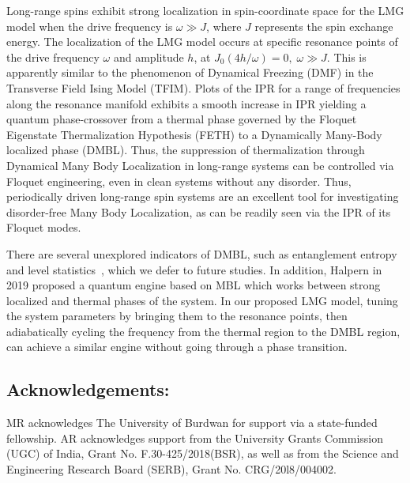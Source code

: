 \documentclass[%
reprint,
superscriptaddress,
amsmath,amssymb,
aps,
prb,
showkeys,
]{revtex4-2}
\begin{document}
Long-range spins exhibit strong localization in spin-coordinate space for the LMG model when the drive frequency is $\omega \gg J$, where $J$ represents the spin exchange energy. The localization of the LMG model occurs at specific resonance points of the drive frequency $\omega$ and amplitude $h$, at $J_0(4h/\omega)=0,\; \omega \gg J$. This is apparently similar to the phenomenon of Dynamical Freezing (DMF) in the Transverse Field Ising Model (TFIM). Plots of the IPR for a range of frequencies along the resonance manifold exhibits a smooth increase in IPR yielding a quantum phase-crossover from a thermal phase governed by the Floquet Eigenstate Thermalization Hypothesis (FETH) to a Dynamically Many-Body localized phase (DMBL). Thus, the suppression  of thermalization through  Dynamical Many Body Localization in long-range systems can be controlled via Floquet engineering, even in clean systems without any disorder.	Thus, periodically driven long-range spin systems are an excellent tool for investigating disorder-free Many Body Localization, as can be readily seen via the IPR of its Floquet modes.

There are several unexplored indicators of DMBL, such as entanglement entropy and level statistics~\cite{khemani_phase_2016}, which we defer to future studies. In addition, Halpern in 2019 proposed a quantum engine based on MBL\cite{yunger_halpern_quantum_2019} which works  between strong localized and thermal phases of the system. In our proposed LMG model, tuning the system parameters by bringing them to the resonance points, then adiabatically cycling the frequency from the thermal region to the DMBL region, can achieve a similar engine without going through a phase transition. 

\subsection {Acknowledgements:}
MR acknowledges The University of Burdwan for support via a state-funded fellowship. AR acknowledges support from the University Grants Commission (UGC) of India, Grant No. F.30-425/2018(BSR), as well as from the Science and Engineering Research Board (SERB), Grant No. CRG/20l8/004002.


\end{document}
